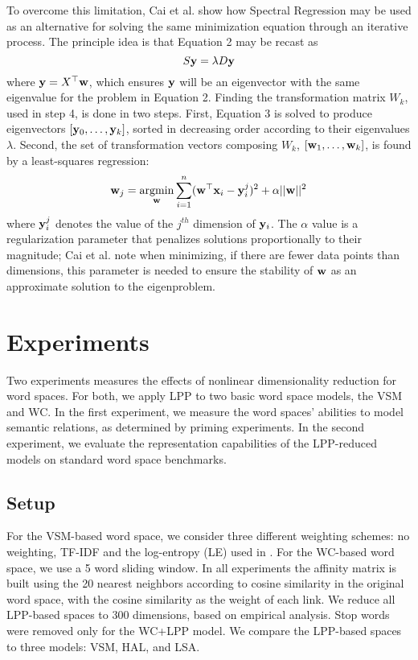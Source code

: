 \documentclass[11pt]{article}
\newcommand{\argmin}{\operatornamewithlimits{argmin}}
\begin{document}
To overcome this limitation, Cai et al.  show how
Spectral Regression may be used as an alternative for solving the same
minimization equation through an iterative process.  The principle idea is that
Equation 2 may be recast as
\begin{equation}
  S{\bf y} = \lambda D {\bf y}
\end{equation}
where ${\bf y}=X^{\top}{\bf w}$, which ensures $\bf y$ will be an eigenvector
with the same eigenvalue for the problem in Equation 2.  Finding  the
transformation matrix $W_k$, used in step 4, is done in two steps.  First, 
Equation 3 is solved to produce eigenvectors $[ {\bf y}_0, \ldots, {\bf y}_k]$,
sorted in decreasing order according to their eigenvalues $\lambda$.  Second,
the set of transformation vectors composing $W_k$, $[{\bf w}_1,\ldots, {\bf
w}_k]$, is found by a least-squares regression:
\begin{equation}
  {\bf w}_j = \argmin_{\bf w} \sum^{n}_{i=1}({\bf w}^{\top}{\bf x}_i - {\bf y}_i^j)^2 +
  \alpha||{\bf w}||^2
\end{equation}
where
${\bf y}_i^j$ denotes the
value of the $j^{th}$ dimension of ${\bf y}_i$.  The $\alpha$ value is a
regularization parameter that penalizes solutions proportionally to their
magnitude; Cai et al.  note when minimizing, if
there are fewer data points than dimensions, this parameter is needed to ensure
the stability of ${\bf w}$ as an approximate solution to the eigenproblem.


\section{Experiments}
\label{sec:experiments}

Two experiments measures the effects of nonlinear dimensionality reduction for
word spaces.  For both, we apply LPP to two basic word space models, the VSM and
WC.  In the first experiment, we measure the word spaces' abilities to model
semantic relations, as determined by priming experiments.  In the second
experiment, we evaluate the representation capabilities of the LPP-reduced
models on standard word space benchmarks.

\subsection{Setup} 

For the VSM-based word space, we consider three different weighting schemes: no
weighting, TF-IDF and the log-entropy (LE) used in \cite{landauer97solution}.
For the WC-based word space, we use a 5 word sliding window.  In all
experiments the affinity matrix is built using the 20 nearest neighbors
according to cosine similarity in the original word space, with the cosine
similarity as the weight of each link.  We reduce all LPP-based spaces to 300
dimensions, based on empirical analysis.  Stop words were removed only for the
WC+LPP model.
We compare the LPP-based spaces to three models: VSM, HAL, and LSA.
\end{document}
